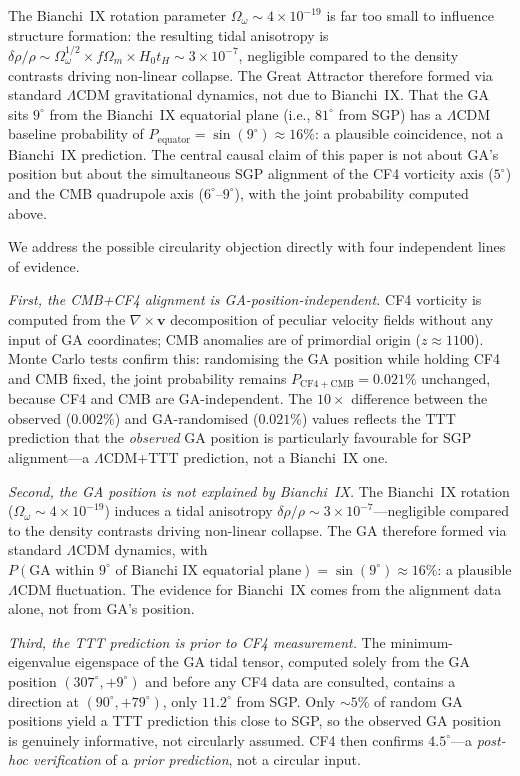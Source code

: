 \documentclass[12pt]{article}
\begin{document}
The Bianchi~IX rotation parameter $\Omega_\omega\sim4\times10^{-19}$ is far too
small to influence structure formation: the resulting tidal anisotropy is
$\delta\rho/\rho\sim\Omega_\omega^{1/2}\times f\Omega_m\times H_0 t_H\sim3\times10^{-7}$,
negligible compared to the density contrasts driving non-linear collapse.
The Great Attractor therefore formed via standard $\Lambda$CDM gravitational
dynamics, not due to Bianchi~IX.
That the GA sits $9^\circ$ from the Bianchi~IX equatorial plane (i.e., $81^\circ$
from SGP) has a $\Lambda$CDM baseline probability of
$P_\mathrm{equator}=\sin(9^\circ)\approx16\%$: a plausible coincidence, not a
Bianchi~IX prediction. The central causal claim of this paper is not about GA's
position but about the simultaneous SGP alignment of the CF4 vorticity axis
($5^\circ$) and the CMB quadrupole axis ($6^\circ$--$9^\circ$), with the joint
probability computed above.

We address the possible circularity objection directly with four independent
lines of evidence.

\emph{First, the CMB+CF4 alignment is GA-position-independent.}
CF4 vorticity is computed from the $\nabla\times\mathbf{v}$ decomposition of
peculiar velocity fields without any input of GA coordinates; CMB anomalies are
of primordial origin ($z\approx1100$).
Monte Carlo tests confirm this: randomising the GA position while holding CF4
and CMB fixed, the joint probability remains $P_\mathrm{CF4+CMB}=0.021\%$
unchanged, because CF4 and CMB are GA-independent.
The $10\times$ difference between the observed ($0.002\%$) and GA-randomised
($0.021\%$) values reflects the TTT prediction that the \emph{observed} GA
position is particularly favourable for SGP alignment---a $\Lambda$CDM+TTT
prediction, not a Bianchi~IX one.

\emph{Second, the GA position is not explained by Bianchi~IX.}
The Bianchi~IX rotation ($\Omega_\omega\sim4\times10^{-19}$) induces a tidal
anisotropy $\delta\rho/\rho\sim3\times10^{-7}$---negligible compared to the
density contrasts driving non-linear collapse.
The GA therefore formed via standard $\Lambda$CDM dynamics, with
$P(\text{GA within }9^\circ\text{ of Bianchi~IX equatorial plane}) = \sin(9^\circ)\approx16\%$:
a plausible $\Lambda$CDM fluctuation.
The evidence for Bianchi~IX comes from the alignment data alone, not from
GA's position.

\emph{Third, the TTT prediction is prior to CF4 measurement.}
The minimum-eigenvalue eigenspace of the GA tidal tensor, computed solely from
the GA position $(307^\circ, +9^\circ)$ and before any CF4 data are consulted,
contains a direction at $(90^\circ, +79^\circ)$, only $11.2^\circ$ from SGP.
Only $\sim5\%$ of random GA positions yield a TTT prediction this close to SGP,
so the observed GA position is genuinely informative, not circularly assumed.
CF4 then confirms $4.5^\circ$---a \emph{post-hoc verification} of a
\emph{prior prediction}, not a circular input.
\end{document}
